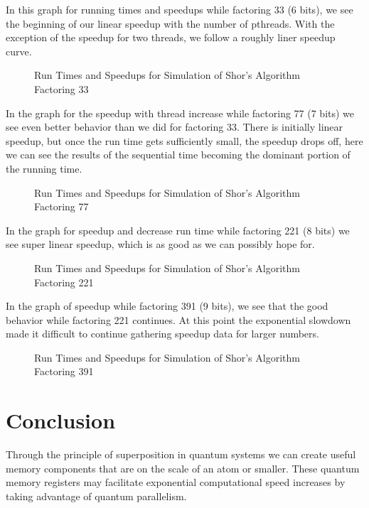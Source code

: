 \documentclass[]{article}
\begin{document}
In this graph for running times and speedups while factoring 33 (6
bits), we see the beginning of our linear speedup with the number of
pthreads.  With the exception of the speedup for two threads, we
follow a roughly liner speedup curve.

\begin{figure}[ht]
\caption{Run Times and Speedups for Simulation of Shor's Algorithm Factoring 33}
\end{figure}

In the graph for the speedup with thread increase while factoring 77
(7 bits) we see even better behavior than we did for factoring 33.
There is initially linear speedup, but once the run time gets
sufficiently small, the speedup drops off, here we can see the results
of the sequential time becoming the dominant portion of the running
time.

\begin{figure}[ht]
\caption{Run Times and Speedups for Simulation of Shor's Algorithm Factoring 77}
\end{figure}

In the graph for speedup and decrease run time while factoring 221 (8
bits) we see super linear speedup, which is as good as we can possibly
hope for.

\begin{figure}[ht]
\caption{Run Times and Speedups for Simulation of Shor's Algorithm Factoring 221}
\end{figure}

In the graph of speedup while factoring 391 (9 bits), we see that the
good behavior while factoring 221 continues.  At this point the
exponential slowdown made it difficult to continue gathering speedup
data for larger numbers.

\begin{figure}[ht]
\caption{Run Times and Speedups for Simulation of Shor's Algorithm Factoring 391}
\end{figure}

\section{Conclusion}

Through the principle of superposition in quantum systems we can
create useful memory components that are on the scale of an atom or
smaller. These quantum memory registers may facilitate exponential
computational speed increases by taking advantage of quantum
parallelism.
\end{document}
